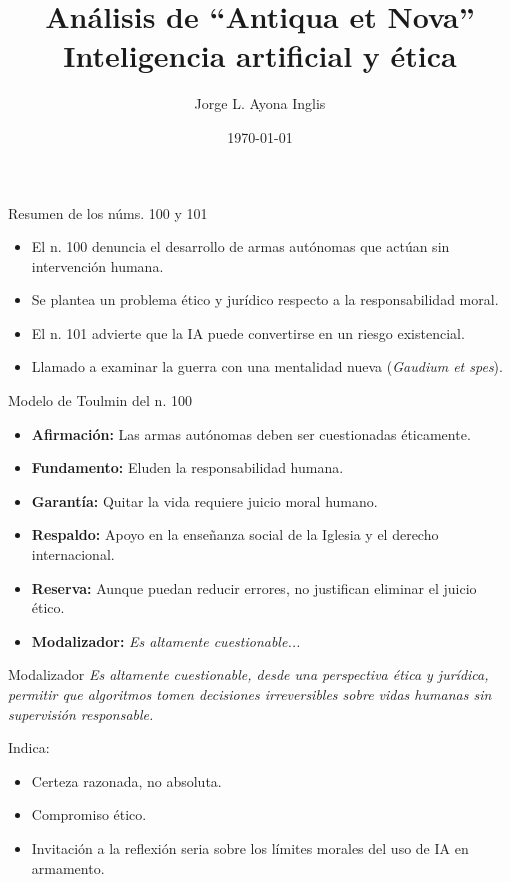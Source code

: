 \documentclass[aspectratio=169]{beamer}
\title{Análisis de ``Antiqua et Nova''\\Inteligencia artificial y ética}
\author{Jorge L. Ayona Inglis}
\date{\today}
\begin{document}
\frame{\titlepage}

\begin{frame}{Resumen de los núms. 100 y 101}
\begin{itemize}
  \item El n. 100 denuncia el desarrollo de armas autónomas que actúan sin intervención humana.
  \item Se plantea un problema ético y jurídico respecto a la responsabilidad moral.
  \item El n. 101 advierte que la IA puede convertirse en un riesgo existencial.
  \item Llamado a examinar la guerra con una mentalidad nueva (\textit{Gaudium et spes}).
\end{itemize}
\end{frame}

\begin{frame}{Modelo de Toulmin del n. 100}
\begin{itemize}
  \item \textbf{Afirmación:} Las armas autónomas deben ser cuestionadas éticamente.
  \item \textbf{Fundamento:} Eluden la responsabilidad humana.
  \item \textbf{Garantía:} Quitar la vida requiere juicio moral humano.
  \item \textbf{Respaldo:} Apoyo en la enseñanza social de la Iglesia y el derecho internacional.
  \item \textbf{Reserva:} Aunque puedan reducir errores, no justifican eliminar el juicio ético.
  \item \textbf{Modalizador:} \textit{Es altamente cuestionable...}
\end{itemize}
\end{frame}

\begin{frame}{Modalizador}
\textit{Es altamente cuestionable, desde una perspectiva ética y jurídica, permitir que algoritmos tomen decisiones irreversibles sobre vidas humanas sin supervisión responsable.}

\vspace{1em}
Indica:
\begin{itemize}
  \item Certeza razonada, no absoluta.
  \item Compromiso ético.
  \item Invitación a la reflexión seria sobre los límites morales del uso de IA en armamento.
\end{itemize}
\end{frame}
\end{document}
